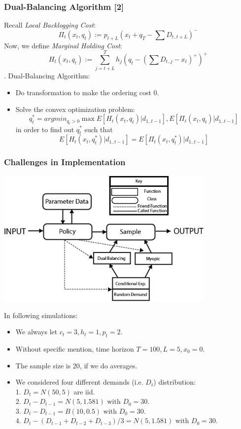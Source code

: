 \documentclass{beamer}
\begin{document}
\begin{frame}
    \frametitle{Dual-Balancing Algorithm [2]}
    Recall {\em Local Backlogging Cost}: 
    $$\Pi_t(x_t,q_t) := p_{t+L}(x_t + q_T - \sum D_{t..t+L})^{-}$$
    Now, we define {\em Marginal Holding Cost}:
    $$H_t(x_t,q_t) := \sum_{j = t+L}^{T} h_j (q_t - (\sum D_{t..j} - x_t)^+)^+$$.
    Dual-Balancing Algorithm:
    \begin{itemize}
      \item 
        Do transformation to make the ordering cost 0.
      \item
        Solve the convex optimization problem:
        $$q_t^* = argmin_{q_t > 0} \max{E[H_t(x_t,q_t)| d_{1..t-1}], E[\Pi_t(x_t,q_t)| d_{1..t-1}]}$$
        in order to find out $q_t^*$ such that
        $$E[H_t(x_t,q_t^*)| d_{1..t-1}] = E[\Pi_t(x_t,q_t^*)| d_{1..t-1}]$$
    \end{itemize}
\end{frame}

\begin{frame}
  \frametitle{Challenges in Implementation}
  \begin{center}
    \includegraphics[height=2.65in]{software_diagram.png}
  \end{center}
\end{frame}

\begin{frame}
In following simulations:
    \begin{itemize}
      \item We always let $c_t = 3, h_t = 1, p_t = 2$.
      \item Without specific mention, time horizon $T = 100, L = 5, x_0 = 0$.
      \item The sample size is 20, if we do averages.
      \item We considered four different demands (i.e. $D_t$) distribution:\\
            1. $D_t = N(50,5)$ are iid.\\
            2. $D_t-D_{t-1} = N(5,1.581)$ with $D_0=30$.\\
            3. $D_t-D_{t-1} = B(10,0.5)$ with $D_0=30$.\\
            4. $D_t- (D_{t-1} + D_{t-2} + D_{t-3})/3 = N(5,1.581)$ with $D_0=30$.
    \end{itemize}
\end{frame}
\end{document}
